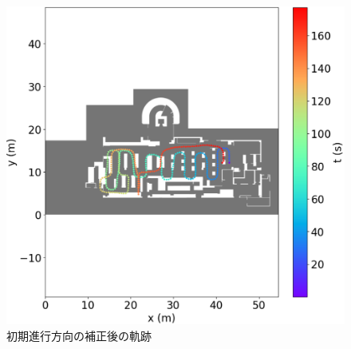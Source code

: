 \begin{figure}[ht]
	\centering
	\includegraphics[width=\linewidth]{image/pdr-rotate.jpg}
	\caption{初期進行方向の補正後の軌跡}    \label{fig:pdr-rotate}
\end{figure}





